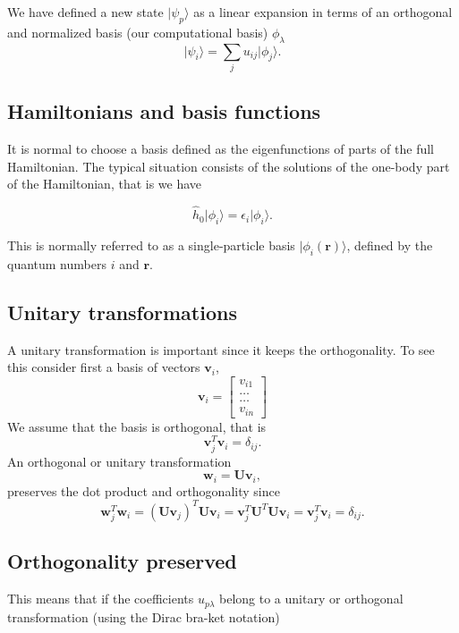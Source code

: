 We have defined a new state $\vert \psi_p\rangle$ as a linear expansion in terms of an orthogonal and normalized basis (our computational basis) $\phi_{\lambda}$
\begin{equation}
\vert \psi_i\rangle = \sum_{j} u_{ij}\vert \phi_{j}\rangle.
\end{equation}

\subsection{Hamiltonians and basis functions}

It is normal to choose a basis defined as the eigenfunctions of parts
of the full Hamiltonian. The typical situation consists of the
solutions of the one-body part of the Hamiltonian, that is we have

\[
\hat{h}_0\vert \phi_{i}\rangle=\epsilon_{i}\vert \phi_{i}\rangle.
\]

This is normally referred to as a single-particle basis $\vert\phi_{i}(\mathbf{r})\rangle$,
defined by the quantum numbers $i$ and $\mathbf{r}$.

\subsection{Unitary transformations}
A unitary transformation is important since it keeps the orthogonality.
To see this consider first a basis of vectors $\mathbf{v}_i$,
\[
\mathbf{v}_i = \begin{bmatrix} v_{i1} \\ \dots \\ \dots \\v_{in} \end{bmatrix}
\]
We assume that the basis is orthogonal, that is 
\[
\mathbf{v}_j^T\mathbf{v}_i = \delta_{ij}.
\]
An orthogonal or unitary transformation
\[
\mathbf{w}_i=\mathbf{U}\mathbf{v}_i,
\]
preserves the dot product and orthogonality since
\[
\mathbf{w}_j^T\mathbf{w}_i=(\mathbf{U}\mathbf{v}_j)^T\mathbf{U}\mathbf{v}_i=\mathbf{v}_j^T\mathbf{U}^T\mathbf{U}\mathbf{v}_i= \mathbf{v}_j^T\mathbf{v}_i = \delta_{ij}.
\]

\subsection{Orthogonality preserved}

This means that if the coefficients $u_{p\lambda}$ belong to a unitary
or orthogonal transformation (using the Dirac bra-ket notation)

